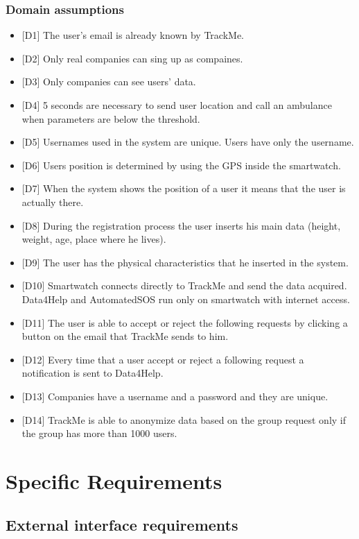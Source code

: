 \documentclass{article}
\begin{document}
\subsubsection{Domain assumptions}
\begin{itemize}
	\item {[D1]} The user's email is already known by TrackMe.
	\item {[D2]} Only real companies can sing up as compaines.
	\item {[D3]} Only companies can see users' data.
	\item {[D4]} 5 seconds are necessary to send user location and call an ambulance when parameters are below the threshold.
	\item {[D5]} Usernames used in the system are unique. Users have only the username.
	\item {[D6]} Users position is determined by using the GPS inside the smartwatch.
	\item {[D7]} When the system shows the position of a user it means that the user is
actually there.
	\item {[D8]} During the registration process the user inserts his main data (height, weight, age, place where he lives).
	\item {[D9]} The user has the physical characteristics that he inserted in the system.
	\item {[D10]} Smartwatch connects directly to TrackMe and send the data acquired. Data4Help and AutomatedSOS run only on smartwatch with internet access.
	\item {[D11]} The user is able to accept or reject the following requests by clicking a button on the email that TrackMe sends to him.
	\item {[D12]} Every time that a user accept or reject a following request a notification is sent to Data4Help.
	\item {[D13]} Companies have a username and a password and they are unique.
	\item {[D14]} TrackMe is able to anonymize data based on the group request only if the group has more than 1000 users.
\end{itemize}
\section{Specific Requirements}
\subsection{External interface requirements}
\end{document}
